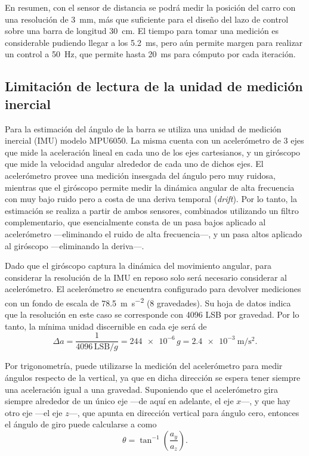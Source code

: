 En resumen, con el sensor de distancia se podrá medir la posición del carro con una resolución de \qty{3}{\mm}, más que suficiente para el diseño del lazo de control sobre una barra de longitud \qty{30}{\cm}. El tiempo para tomar una medición es considerable pudiendo llegar a los \qty{5.2}{\ms}, pero aún permite margen para realizar un control a \qty{50}{\Hz}, que permite hasta \qty{20}{\ms} para cómputo por cada iteración.


\subsection{Limitación de lectura de la unidad de medición inercial}

Para la estimación del ángulo de la barra se utiliza una unidad de medición inercial (IMU) modelo MPU6050. La misma cuenta con un acelerómetro de 3 ejes que mide la aceleración lineal en cada uno de los ejes cartesianos, y un giróscopo que mide la velocidad angular alrededor de cada uno de dichos ejes. El acelerómetro provee una medición insesgada del ángulo pero muy ruidosa, mientras que el giróscopo permite medir la dinámica angular de alta frecuencia con muy bajo ruido pero a costa de una deriva temporal (\emph{drift}). Por lo tanto, la estimación se realiza a partir de ambos sensores, combinados utilizando un filtro complementario, que esencialmente consta de un pasa bajos aplicado al acelerómetro ---eliminando el ruido de alta frecuencia---, y un pasa altos aplicado al giróscopo ---eliminando la deriva---.

Dado que el giróscopo captura la dinámica del movimiento angular, para considerar la resolución de la IMU en reposo solo será necesario considerar al acelerómetro. El acelerómetro se encuentra configurado para devolver mediciones con un fondo de escala de \qty{78.5}{\m\per\s\squared} (8 gravedades). Su hoja de datos indica que la resolución en este caso se corresponde con 4096 LSB por gravedad. Por lo tanto, la mínima unidad discernible en cada eje será de
$$\Delta a = \frac{1}{4096 \, \mathrm{LSB}/g} = \num{244e-6} \, g = \qty{2.4e-3}{\m\per\s\squared}.$$

Por trigonometría, puede utilizarse la medición del acelerómetro para medir ángulos respecto de la vertical, ya que en dicha dirección se espera tener siempre una aceleración igual a una gravedad. Suponiendo que el acelerómetro gira siempre alrededor de un único eje ---de aquí en adelante, el eje $x$---, y que hay otro eje ---el eje $z$---, que apunta en dirección vertical para ángulo cero, entonces el ángulo de giro puede calcularse a como
$$\theta = \tan^{-1}\left(\frac{a_y}{a_z}\right).$$

